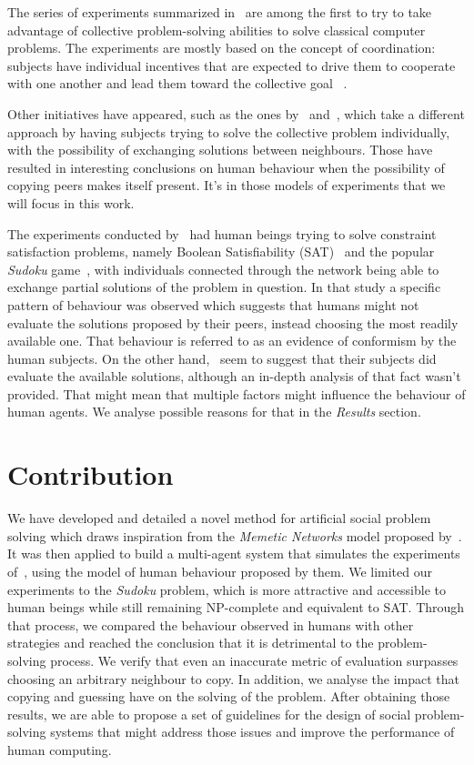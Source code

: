 \documentclass{article}
\begin{document}
The series of experiments summarized in~\cite{kearns:experim} are among the first to try to take advantage of collective problem-solving abilities to solve classical computer problems. The experiments are mostly based on the concept of coordination: subjects have individual incentives that are expected to drive them to cooperate with one another and lead them toward the collective goal ~\cite{nowak:evolutioncooperation}.

Other initiatives have appeared, such as the ones by~\cite{farenzena:collabem} and~\cite{mason:collablearnet}, which take a different approach by having subjects trying to solve the collective problem individually, with the possibility of exchanging solutions between neighbours. Those have resulted in interesting conclusions on human behaviour when the possibility of copying peers makes itself present. It's in those models of experiments that we will focus in this work.

The experiments conducted by~\cite{farenzena:collabem} had human beings trying to solve constraint satisfaction problems, namely Boolean Satisfiability (SAT)~\cite{cook:complexitytheoremproving} and the popular \emph{Sudoku} game~\cite{weber:satsudoku}, with individuals connected through the network being able to exchange partial solutions of the problem in question. In that study a specific pattern of behaviour was observed which suggests that humans might not evaluate the solutions proposed by their peers, instead choosing the most readily available one. That behaviour is referred to as an evidence of conformism by the human subjects. On the other hand,~\cite{mason:collablearnet} seem to suggest that their subjects did evaluate the available solutions, although an in-depth analysis of that fact wasn't provided. That might mean that multiple factors might influence the behaviour of human agents. We analyse possible reasons for that in the \emph{Results} section.

\section{Contribution}

We have developed and detailed a novel method for artificial social problem solving which draws inspiration from the {\em Memetic Networks} model proposed by~\cite{araujo:memenet}. It was then applied to build a multi-agent system that simulates the experiments of~\cite{farenzena:collabem}, using the model of human behaviour proposed by them. We limited our experiments to the {\em Sudoku} problem, which is more attractive and accessible to human beings while still remaining NP-complete and equivalent to SAT. Through that process, we compared the behaviour observed in humans with other strategies and reached the conclusion that it is detrimental to the problem-solving process. We verify that even an inaccurate metric of evaluation surpasses choosing an arbitrary neighbour to copy. In addition, we analyse the impact that copying and guessing have on the solving of the problem. After obtaining those results, we are able to propose a set of guidelines for the design of social problem-solving systems that might address those issues and improve the performance of human computing.
\end{document}
